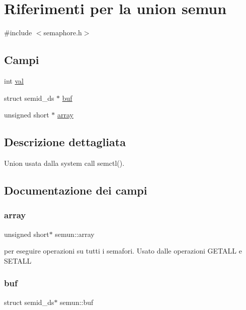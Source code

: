 \hypertarget{unionsemun}{}\section{Riferimenti per la union semun}
\label{unionsemun}


{\ttfamily \#include $<$semaphore.\+h$>$}

\subsection*{Campi}
\begin{DoxyCompactItemize}
\item 
int \hyperlink{unionsemun_ac6121ecb6d04a024e07e12bd71b94031}{val}
\item 
struct semid\+\_\+ds $\ast$ \hyperlink{unionsemun_ac6b6428d07d4147fd2cc698b53555bed}{buf}
\item 
unsigned short $\ast$ \hyperlink{unionsemun_aca23b8e730a0553205813c0cb7692b54}{array}
\end{DoxyCompactItemize}


\subsection{Descrizione dettagliata}
Union usata dalla system call semctl(). 

\subsection{Documentazione dei campi}
\mbox{\label{unionsemun_aca23b8e730a0553205813c0cb7692b54}} 
\subsubsection{\texorpdfstring{array}{array}}
{\footnotesize\ttfamily unsigned short$\ast$ semun\+::array}

per eseguire operazioni su tutti i semafori. Usato dalle operazioni G\+E\+T\+A\+LL e S\+E\+T\+A\+LL \mbox{\label{unionsemun_ac6b6428d07d4147fd2cc698b53555bed}} 
\subsubsection{\texorpdfstring{buf}{buf}}
{\footnotesize\ttfamily struct semid\+\_\+ds$\ast$ semun\+::buf}

